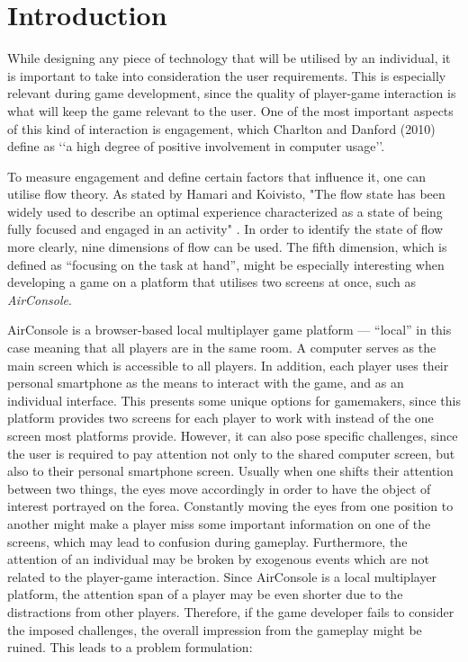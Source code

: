 \chapter{Introduction}\label{ch:introduction}
While designing any piece of technology that will be utilised by an individual, it is important to take into consideration the user requirements. This is especially relevant during game development, since the quality of player-game interaction is what will keep the game relevant to the user. One of the most important aspects of this kind of interaction is engagement, which Charlton and Danford (2010) \cite{Charlton2010} define as ‘‘a high degree of positive involvement in computer usage’’. 

To measure engagement and define certain factors that influence it, one can utilise flow theory. As stated by Hamari and Koivisto, "The flow state has been widely used to describe an optimal experience
characterized as a state of being fully focused and engaged in
an activity" \cite{Hamari2014}. In order to identify the state of flow more clearly, nine dimensions of flow can be used. The fifth dimension, which is defined as “focusing on the task at hand”, might be especially interesting when developing a game on a platform that utilises two screens at once, such as \textit{AirConsole}.

AirConsole is a browser-based local multiplayer game platform --- “local” in this case meaning that all players are in the same room. A computer serves as the main screen which is accessible to all players. In addition, each player uses their personal smartphone as the means to interact with the game, and as an individual interface. This presents some unique options for gamemakers, since this platform provides two screens for each player to work with instead of the one screen most platforms provide. However, it can also pose specific challenges, since the user is required to pay attention not only to the shared computer screen, but also to their personal smartphone screen. Usually when one shifts their attention between two things, the eyes move accordingly in order to have the object of interest portrayed on the forea. Constantly moving the eyes from one position to another might make a player miss some important information on one of the screens, which may lead to confusion during gameplay. Furthermore, the attention of an individual may be broken by exogenous events which are not related to the player-game interaction. Since AirConsole is a local multiplayer platform, the attention span of a player may be even shorter due to the distractions from other players. Therefore, if the game developer fails to consider the imposed challenges, the overall impression from the gameplay might be ruined. This leads to a problem formulation:

